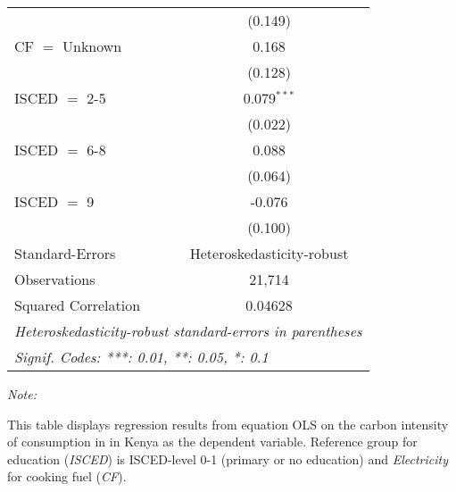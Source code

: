 \begin{table}[htbp!]
\begin{adjustbox}{width = 1\textwidth, max height = 0.95\textheight, center}
\begin{threeparttable}[b]
\begin{tabular}{lc}
                                & (0.149)\\   
            CF $=$ Unknown      & 0.168\\   
                                & (0.128)\\   
            ISCED $=$ 2-5       & 0.079$^{***}$\\   
                                & (0.022)\\   
            ISCED $=$ 6-8       & 0.088\\   
                                & (0.064)\\   
            ISCED $=$ 9         & -0.076\\   
                                & (0.100)\\   
            \midrule 
            Standard-Errors     & Heteroskedasticity-robust \\   
            Observations        & 21,714\\  
            Squared Correlation & 0.04628\\  
            \midrule \midrule
            \multicolumn{2}{l}{\emph{Heteroskedasticity-robust standard-errors in parentheses}}\\
            \multicolumn{2}{l}{\emph{Signif. Codes: ***: 0.01, **: 0.05, *: 0.1}}\\
         \end{tabular}
         
         \begin{tablenotes}\item \medskip \textit{Note:}
            \item This table displays regression results from equation OLS on the carbon intensity of consumption in  in Kenya as the dependent variable. Reference group for education (\textit{ISCED}) is ISCED-level 0-1 (primary or no education) and \textit{Electricity} for cooking fuel (\textit{CF}).
         \end{tablenotes}
      \end{threeparttable}
   \end{adjustbox}
\end{table}


